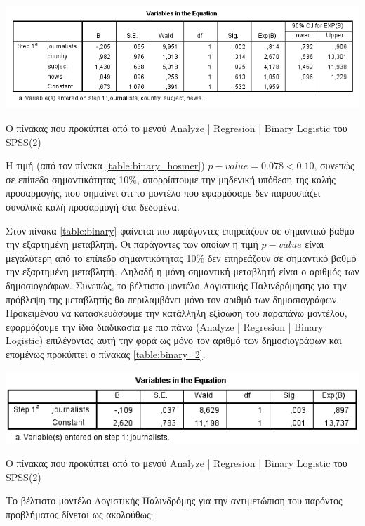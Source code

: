 \documentclass{assignment}
\begin{document}
\begin{Assignment}[Μέρος Ε]
\begin{table}[htbp]
\includegraphics[width=\textwidth]{images/table_binary.png}
\caption{Ο πίνακας που προκύπτει από το μενού Analyze | Regresion | Binary Logistic του SPSS(2) }
\label{table:binary}
\end{table}

Η τιμή (από τον πίνακα \ref{table:binary_hosmer}) $p-value = 0.078 < 0.10$, συνεπώς σε επίπεδο σημαντικότητας 10\%,  απορρίπτουμε την μηδενική υπόθεση της καλής προσαρμογής, που σημαίνει ότι το μοντέλο που εφαρμόσαμε δεν παρουσιάζει συνολικά καλή προσαρμογή στα δεδομένα.

Στον πίνακα \ref{table:binary} φαίνεται πιο παράγοντες επηρεάζουν σε σημαντικό βαθμό την εξαρτημένη μεταβλητή. Οι παράγοντες των οποίων η τιμή $p-value$ είναι μεγαλύτερη από το επίπεδο σημαντικότητας 10\% δεν επηρεάζουν σε σημαντικό βαθμό την εξαρτημένη μεταβλητή. Δηλαδή η μόνη σημαντική μεταβλητή είναι ο αριθμός των δημοσιογράφων.  Συνεπώς, το βέλτιστο μοντέλο Λογιστικής Παλινδρόμησης για την πρόβλεψη της μεταβλητής θα περιλαμβάνει μόνο τον αριθμό των δημοσιογράφων. Προκειμένου να κατασκευάσουμε την κατάλληλη εξίσωση του παραπάνω μοντέλου, εφαρμόζουμε την ίδια διαδικασία με πιο πάνω (Analyze | Regresion | Binary Logistic) επιλέγοντας αυτή την φορά ως  μόνο τον αριθμό των δημοσιογράφων και επομένως προκύπτει ο πίνακας \ref{table:binary_2}.

\begin{table}[htbp]
\includegraphics[width=\textwidth]{images/table_binary_2.png}
\caption{Ο πίνακας που προκύπτει από το μενού Analyze | Regresion | Binary Logistic του SPSS(2) }
\label{table:binary_2}
\end{table}

Το βέλτιστο μοντέλο Λογιστικής Παλινδρόμης για την αντιμετώπιση του παρόντος προβλήματος δίνεται ως ακολούθως:


\end{Assignment}
\end{document}
